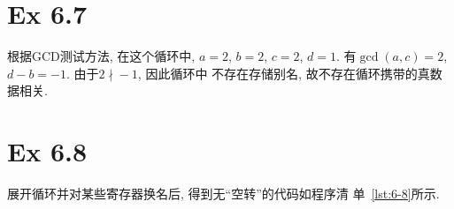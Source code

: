 \section{Ex 6.7}

\begin{solve}
  根据GCD测试方法, 在这个循环中, $a=2$, $b=2$, $c=2$,
  $d=1$. 有$\gcd(a, c) = 2$, $d-b = -1$. 由于$2\nmid{}-1$, 因此循环中
  不存在存储别名, 故不存在循环携带的真数据相关.
\end{solve}

\section{Ex 6.8}

\begin{solve}
  展开循环并对某些寄存器换名后, 得到无``空转''的代码如程序清
  单~\ref{lst:6-8}所示.

  
\end{solve}



